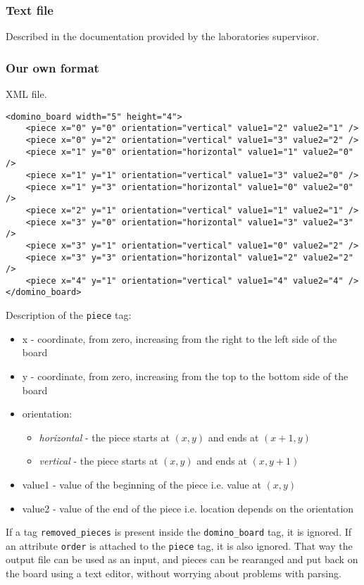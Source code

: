 \subsubsection{Text file}
Described in the documentation provided by the laboratories supervisor.

\subsubsection{Our own format}
XML file.
\begin{verbatim}
<domino_board width="5" height="4">
    <piece x="0" y="0" orientation="vertical" value1="2" value2="1" />
    <piece x="0" y="2" orientation="vertical" value1="3" value2="2" />
    <piece x="1" y="0" orientation="horizontal" value1="1" value2="0" />
    <piece x="1" y="1" orientation="vertical" value1="3" value2="0" />
    <piece x="1" y="3" orientation="horizontal" value1="0" value2="0" />
    <piece x="2" y="1" orientation="vertical" value1="1" value2="1" />
    <piece x="3" y="0" orientation="horizontal" value1="3" value2="3" />
    <piece x="3" y="1" orientation="vertical" value1="0" value2="2" />
    <piece x="3" y="3" orientation="horizontal" value1="2" value2="2" />
    <piece x="4" y="1" orientation="vertical" value1="4" value2="4" />
</domino_board>
\end{verbatim}

\noindent Description of the \verb|piece| tag:
\begin{itemize}[noitemsep,nolistsep]
  \item x - coordinate, from zero, increasing from the right to the left side of the board
  \item y - coordinate, from zero, increasing from the top to the bottom side of the board
  \item orientation:
   \begin{itemize}[noitemsep,nolistsep]
   \item \emph{horizontal} - the piece starts at $(x,y)$ and ends at $(x+1,y)$
   \item \emph{vertical} - the piece starts at $(x,y)$ and ends at $(x,y+1)$
   \end{itemize}
  \item value1 - value of the beginning of the piece i.e. value at $(x,y)$
  \item value2 - value of the end of the piece i.e. location depends on the orientation
\end{itemize}

\vspace{10pt}

If a tag \verb|removed_pieces| is present inside the \verb|domino_board| tag, it is ignored. If an
attribute \verb|order| is attached to the \verb|piece| tag, it is also ignored. That way the output file 
can be used as an input, and pieces can be rearanged and put back on the board using a text editor, without
worrying about problems with parsing.
